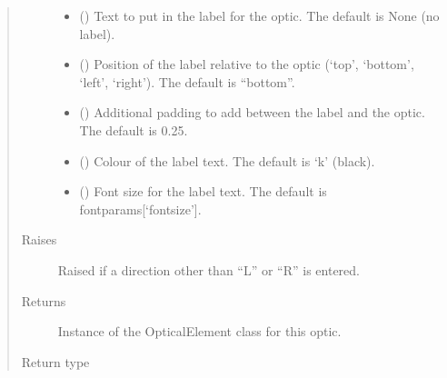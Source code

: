 \documentclass[letterpaper,10pt,english]{sphinxmanual}
\begin{document}
\begin{fulllineitems}
\begin{fulllineitems}
\begin{quote}
\begin{description}
\begin{itemize}
\item {} 
\sphinxAtStartPar
{} (\sphinxstyleliteralemphasis{\sphinxupquote{, }}) \textendash{} Text to put in the label for the optic. The default is None (no label).

\item {} 
\sphinxAtStartPar
{} (\sphinxstyleliteralemphasis{\sphinxupquote{, }}) \textendash{} Position of the label relative to the optic (‘top’, ‘bottom’, ‘left’, ‘right’).
The default is “bottom”.

\item {} 
\sphinxAtStartPar
{} (\sphinxstyleliteralemphasis{\sphinxupquote{, }}) \textendash{} Additional padding to add between the label and the optic. The default is 0.25.

\item {} 
\sphinxAtStartPar
{} (\sphinxstyleliteralemphasis{\sphinxupquote{, }}) \textendash{} Colour of the label text. The default is ‘k’ (black).

\item {} 
\sphinxAtStartPar
{} (\sphinxstyleliteralemphasis{\sphinxupquote{, }}) \textendash{} Font size for the label text. The default is fontparams{[}‘fontsize’{]}.

\end{itemize}

\item[{Raises}] \leavevmode
\sphinxAtStartPar
{} \textendash{} Raised if a direction other than “L” or “R” is entered.

\item[{Returns}] \leavevmode
\sphinxAtStartPar
Instance of the OpticalElement class for this optic.

\item[{Return type}] \leavevmode
\sphinxAtStartPar
{\hyperref[\detokenize{index:pyopticaltable.OpticalElement}]{}}


\end{description}
\end{quote}
\end{fulllineitems}
\end{fulllineitems}
\end{document}
